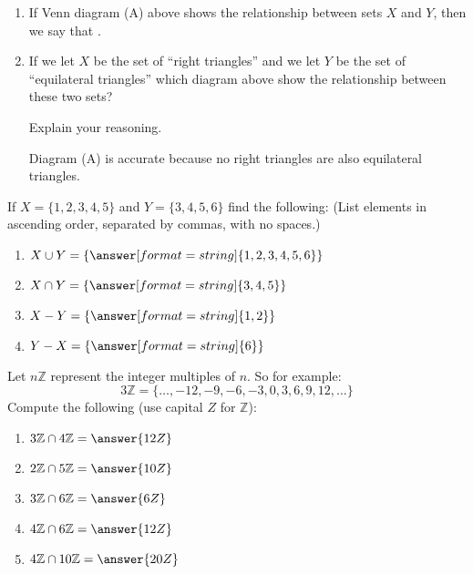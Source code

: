 \documentclass[nooutcomes]{ximera}
\begin{document}
\begin{problem}
\begin{enumerate}
\item If Venn diagram (A) above shows the relationship between sets $X$ and $Y$, then we say that .

\item If we let $X$ be the set of ``right triangles'' and we let $Y$ be the set of ``equilateral triangles'' which diagram above show the relationship between these two sets?
\begin{multipleChoice}
\end{multipleChoice}

Explain your reasoning.
\begin{freeResponse}
\begin{hint}
Diagram (A) is accurate because no right triangles are also equilateral triangles.  
\end{hint}
\end{freeResponse}
\end{enumerate}
\end{problem}


\begin{problem}
If $X = \{1,2,3,4,5\}$ and $Y = \{3,4,5,6\}$ find the following: (List elements in ascending order, separated by commas, with no spaces.)
\begin{enumerate}
\item $X\cup Y = \{\answer[format=string]{1,2,3,4,5,6}\}$
\item $X\cap Y = \{\answer[format=string]{3,4,5}\}$
\item $X-Y = \{\answer[format=string]{1,2}\}$
\item $Y-X = \{\answer[format=string]{6}\}$
\end{enumerate}
\end{problem}

\begin{problem}
Let $n\mathbb Z$ represent the integer multiples of $n$. So for example:
\[
3\mathbb Z = \{\dots,-12,-9,-6,-3,0,3,6,9,12,\dots\}
\]
Compute the following (use capital $Z$ for $\mathbb Z$):
\begin{enumerate}
\item $3\mathbb Z\cap 4\mathbb Z = \answer{12Z}$ 
\item $2\mathbb Z\cap 5\mathbb Z = \answer{10Z}$
\item $3\mathbb Z\cap 6\mathbb Z = \answer{6Z}$
\item $4\mathbb Z\cap 6\mathbb Z = \answer{12Z}$
\item $4\mathbb Z\cap 10\mathbb Z = \answer{20Z}$
\end{enumerate}
\end{problem}
\end{document}
